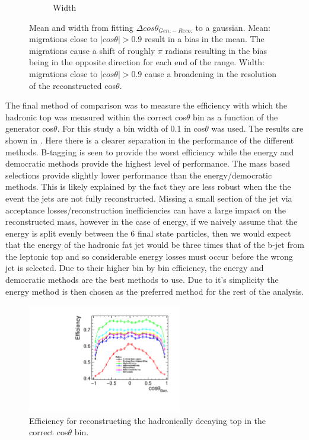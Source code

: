 \begin{figure}
\begin{subfigure}{.5\textwidth}
    \caption[Width]{Width}
  \end{subfigure}
  \caption[Mean and width from fitting $\Delta cos\theta_{Gen.-Reco.}$ to a gaussian]{Mean and width from fitting $\Delta cos\theta_{Gen.-Reco.}$ to a gaussian. Mean: migrations close to $\mid cos\theta\mid>0.9$ result in a bias in the mean. The migrations cause a shift of roughly $\pi$ radians resulting in the bias being in the opposite direction for each end of the range. Width: migrations close to $\mid cos\theta\mid>0.9$ cause a broadening in the resolution of the reconstructed cos$\theta$.}
  \label{fig:angleFitDiff}
\end{figure}

The final method of comparison was to measure the efficiency with which the hadronic top was measured within the correct cos$\theta$ bin as a function of the generator cos$\theta$. For this study a bin width of 0.1 in cos$\theta$ was used. The results are shown in . Here there is a clearer separation in the performance of the different methods. B-tagging is seen to provide the worst efficiency while the energy and democratic methods provide the highest level of performance. The mass based selections provide slightly lower performance than the energy/democratic methods. This is likely explained by the fact they are less robust when the the event the jets are not fully reconstructed. Missing a small section of the jet via acceptance losses/reconstruction inefficiencies can have a large impact on the reconstructed mass, however in the case of energy, if we naively assume that the energy is split evenly between the 6 final state particles, then we would expect that the energy of the hadronic fat jet would be three times that of the b-jet from the leptonic top and so considerable energy losses must occur before the wrong jet is selected. Due to their higher bin by bin efficiency, the energy and democratic methods are the best methods to use. Due to it's simplicity the energy method is then chosen as the preferred method for the rest of the analysis. 

\begin{figure}
  \centering
  \includegraphics[width=0.6\textwidth]{TopAnalysis/figures/EfficiencyvsMCTheta.pdf}
  \caption[Efficiency for reconstructing the hadronically decaying top in the correct cos$\theta$ bin]{Efficiency for reconstructing the hadronically decaying top in the correct cos$\theta$ bin.}
  \label{fig:angularEfficiency}
\end{figure}

